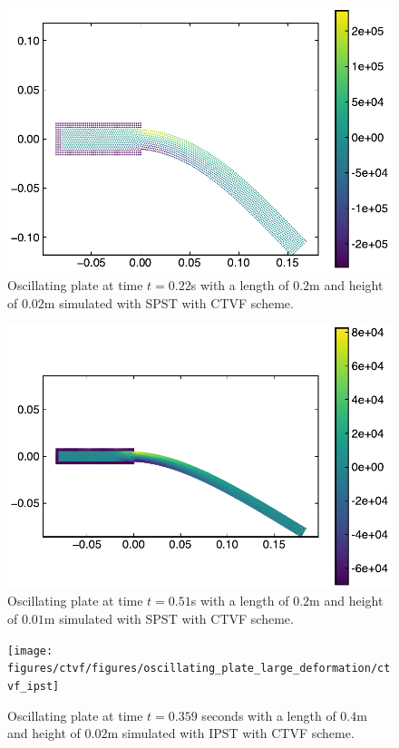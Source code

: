%
%
\begin{figure}
  \centering
  \includegraphics[width=0.8\columnwidth]{figures/ctvf/figures/oscillating_plate/etvf_sun2019_l_0_2_h_0_02}
  \caption{Oscillating plate at time $t=0.22$s with a length of $0.2$m and
    height of $0.02$m simulated with SPST with CTVF scheme.}
\label{fig:oscillating-plate:etvf-sun2019-l-0-2-h-0-22}
\end{figure}
%
%
\begin{figure}[!htp]
  \centering
  \includegraphics[width=0.8\columnwidth]{figures/ctvf/figures/oscillating_plate/etvf_sun2019_l_0_2_h_0_01}
  \caption{Oscillating plate at time $t=0.51$s with a length of $0.2$m and
    height of $0.01$m simulated with SPST with CTVF scheme.}
\label{fig:oscillating-plate:etvf-sun2019-l-0-2-h-0-01}
\end{figure}
%
%
\begin{figure}[!htpb]
  \centering
  \texttt{[image: figures/ctvf/figures/oscillating\_plate\_large\_deformation/ctvf\_ipst]}
  \caption{Oscillating plate at time $t=0.359$ seconds with a length of $0.4$m and
    height of $0.02$m simulated with IPST with CTVF scheme.}
\label{fig:oscillating-plate:etvf-ipst-l-0-4-h-0-02}
\end{figure}

